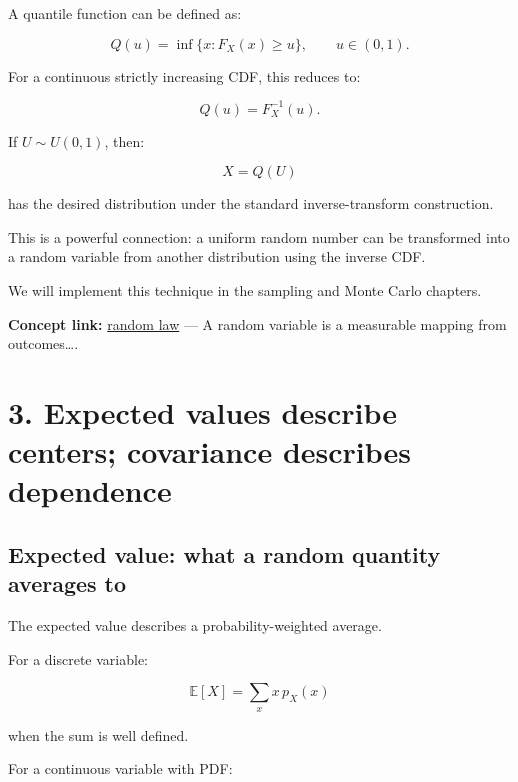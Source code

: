 \hypertarget{02-foundations-ii-ch023-quantiles-and-inverse-cdfs}{}

A quantile function can be defined as:

\[
 \boxed{ Q(u)=\inf\{x:F_X(x)\ge u\} }, \qquad u\in(0,1).
\]

For a continuous strictly increasing CDF, this reduces to:

\[
 Q(u)=F_X^{-1}(u).
\]

If \(U\sim U(0,1)\), then:

\[
 X=Q(U)
\]

has the desired distribution under the standard inverse-transform construction.

This is a powerful connection: a uniform random number can be transformed into a random variable from another distribution using the inverse CDF.

We will implement this technique in the sampling and Monte Carlo chapters.

\textbf{Concept link:} \hyperref[02-foundations-ii-ch023-random-quantities-and-their-probability-laws]{random law} --- A random variable is a measurable mapping from outcomes\ldots.

\section{3. Expected values describe centers; covariance describes dependence}\label{02-foundations-ii-ch023-expected-values-describe-centers-covariance-describes-dependence}

\hypertarget{02-foundations-ii-ch023-expected-values-describe-centers-covariance-describes-dependence}{}

\subsection{Expected value: what a random quantity averages to}\label{02-foundations-ii-ch023-expected-value-what-a-random-quantity-averages-to}

\hypertarget{02-foundations-ii-ch023-expected-value-what-a-random-quantity-averages-to}{}

The expected value describes a probability-weighted average.

For a discrete variable:

\[
 \boxed{ \mathbb E[X]=\sum_xx\,p_X(x) }
\]

when the sum is well defined.

For a continuous variable with PDF:

